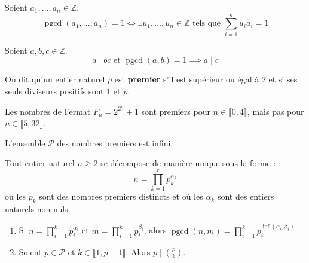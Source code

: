   \begin{theorem}
    Soient $a_1, \dots, a_n \in \mathbb{Z}$.
    \[ \operatorname{pgcd}(a_1, \dots, a_n) = 1 \iff \exists u_1, \dots, u_n \in \mathbb{Z} \text{ tels que } \sum_{i=1}^{n} u_i a_i = 1 \]
  \end{theorem}

  \begin{theorem}
    Soient $a, b, c \in \mathbb{Z}$.
    \[ a \mid bc \text{ et } \operatorname{pgcd}(a,b) = 1 \implies a \mid c \]
  \end{theorem}


  \begin{definition}
    On dit qu'un entier naturel $p$ est \textbf{premier} s'il est supérieur ou égal à $2$ et si ses seuls diviseurs positifs sont $1$ et $p$.
  \end{definition}

  \begin{example}
    Les nombres de Fermat $F_n = 2^{2^n}+1$ sont premiers pour $n \in \llbracket 0,4 \rrbracket$, mais pas pour $n \in \llbracket 5,32 \rrbracket$.
  \end{example}

  \begin{theorem}
    L'ensemble $\mathcal{P}$ des nombres premiers est infini.
  \end{theorem}

  \begin{theorem}
    Tout entier naturel $n \geq 2$ se décompose de manière unique sous la forme :
    \[ n = \prod_{k=1}^r p_k^{\alpha_k} \]
    où les $p_k$ sont des nombres premiers distincts et où les $\alpha_k$ sont des entiers naturels non nuls.
  \end{theorem}


  \begin{proposition}
    \begin{enumerate}[label={\bfseries(\roman*)}]
      \item Si $n = \prod_{i=1}^k p_i^{\alpha_i}$ et $m = \prod_{i=1}^k p_i^{\beta_i}$, alors $\operatorname{pgcd}(n,m) = \prod_{i=1}^k p_i^{\inf(\alpha_i, \beta_i)}$.
      \item Soient $p \in \mathcal{P}$ et $k \in \llbracket 1, p-1 \rrbracket$. Alors $p \mid \binom{p}{k}$.
    \end{enumerate}
  \end{proposition}

